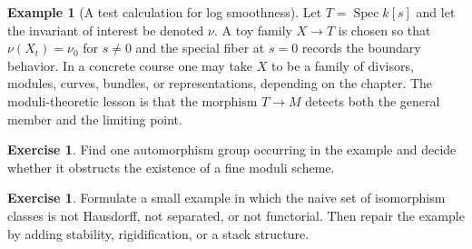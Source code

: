 \documentclass[11pt]{amsart}
\theoremstyle{definition}
\newtheorem{example}[theorem]{Example}
\newtheorem{exercise}[theorem]{Exercise}
\newcommand{\Spec}{\operatorname{Spec}}
\begin{document}
\begin{example}[A test calculation for log smoothness]
Let $T=\Spec k[s]$ and let the invariant of interest be denoted $\nu$.  A toy family $X\to T$ is chosen so that $\nu(X_t)=\nu_0$ for $s\ne0$ and the special fiber at $s=0$ records the boundary behavior.  In a concrete course one may take $X$ to be a family of divisors, modules, curves, bundles, or representations, depending on the chapter.  The moduli-theoretic lesson is that the morphism $T\to M$ detects both the general member and the limiting point.
\end{example}
\begin{exercise}
Find one automorphism group occurring in the example and decide whether it obstructs the existence of a fine moduli scheme.
\end{exercise}
\begin{exercise}
Formulate a small example in which the naive set of isomorphism classes is not Hausdorff, not separated, or not functorial.  Then repair the example by adding stability, rigidification, or a stack structure.
\end{exercise}
\clearpage
\end{document}

